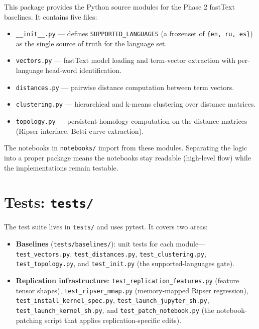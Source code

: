 This package provides the Python source modules for the Phase 2 fastText baselines. It contains five files:

\begin{itemize}
  \item \texttt{\_\_init\_\_.py} --- defines \texttt{SUPPORTED\_LANGUAGES} (a frozenset of \texttt{\{en, ru, es\}}) as the single source of truth for the language set.
  \item \texttt{vectors.py} --- fastText model loading and term-vector extraction with per-language head-word identification.
  \item \texttt{distances.py} --- pairwise distance computation between term vectors.
  \item \texttt{clustering.py} --- hierarchical and k-means clustering over distance matrices.
  \item \texttt{topology.py} --- persistent homology computation on the distance matrices (Ripser interface, Betti curve extraction).
\end{itemize}

The notebooks in \texttt{notebooks/} import from these modules. Separating the logic into a proper package means the notebooks stay readable (high-level flow) while the implementations remain testable.

\section{Tests: \texttt{tests/}}
\label{sec:tests}

The test suite lives in \texttt{tests/} and uses pytest. It covers two areas:

\begin{itemize}
  \item \textbf{Baselines} (\texttt{tests/baselines/}): unit tests for each module---\texttt{test\_vectors.py}, \texttt{test\_distances.py}, \texttt{test\_clustering.py}, \texttt{test\_topology.py}, and \texttt{test\_init.py} (the supported-languages gate).
  \item \textbf{Replication infrastructure}: \texttt{test\_replication\_features.py} (feature tensor shapes), \texttt{test\_ripser\_mmap.py} (memory-mapped Ripser regression), \texttt{test\_install\_kernel\_spec.py}, \texttt{test\_launch\_jupyter\_sh.py}, \texttt{test\_launch\_kernel\_sh.py}, and \texttt{test\_patch\_notebook.py} (the notebook-patching script that applies replication-specific edits).
\end{itemize}

